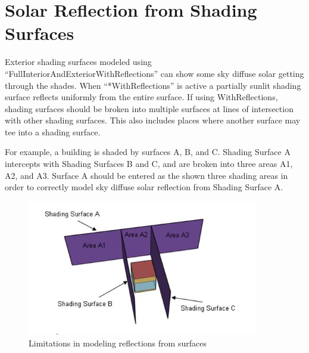 \section{Solar Reflection from Shading Surfaces}\label{solar-reflection-from-shading-surfaces}

Exterior shading surfaces modeled using ``FullInteriorAndExteriorWithReflections'' can show some sky diffuse solar getting through the shades. When ``*WithReflections'' is active a partially sunlit shading surface reflects uniformly from the entire surface. If using WithReflections, shading surfaces should be broken into multiple surfaces at lines of intersection with other shading surfaces. This also includes places where another surface may tee into a shading surface.

For example, a building is shaded by surfaces A, B, and C. Shading Surface A intercepts with Shading Surfaces B and C, and are broken into three areas A1, A2, and A3. Surface A should be entered as the shown three shading areas in order to correctly model sky diffuse solar reflection from Shading Surface A.

\begin{figure}[hbtp] %
\centering
\includegraphics[width=0.9\textwidth, height=0.9\textheight, keepaspectratio=true]{media/image006.jpg}
\caption{Limitations in modeling reflections from surfaces \protect \label{fig:limitations-in-modeling-reflections-from}}
\end{figure}
